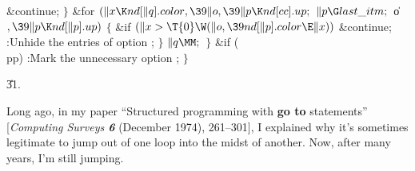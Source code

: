 \&{continue};\6
\4${}\}{}$\2\6
\&{for} ${}(\|x\K\\{nd}[\|q].\\{color},\39\|o,\39\|p\K\\{nd}[\\{cc}].\\{up};{}$
${}\|p\G\\{last\_itm};{}$ \|o${},\39\|p\K\\{nd}[\|p].\\{up}){}$\5
${}\{{}$\1\6
\&{if} ${}(\|x>\T{0}\W(\|o,\39\\{nd}[\|p].\\{color}\E\|x)){}$\1\5
\&{continue};\2\6
:Unhide the entries of option \X;\6
\4${}\}{}$\2\6
${}\|q\MM;{}$\6
\4${}\}{}$\2\6
\&{if} (\\{pp})\1\5
:Mark the unnecessary option \X;\2\6
\4${}\}{}$\2\par
\U31.\fi

Long ago, in my paper ``Structured programming with {\bf go to}
statements''
[{\sl Computing Surveys\/ \bf 6} (December 1974), 261--301], I explained
why it's sometimes legitimate to jump out of one loop into the midst
of another. Now, after many years, I'm still jumping.

